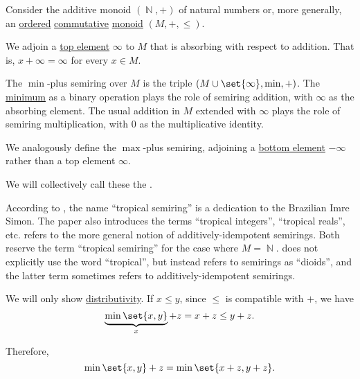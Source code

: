 \begin{definition}\label{def:tropical_semiring}
  Consider the additive monoid \( (\BbbN, +) \) of natural numbers or, more generally, an \hyperref[def:ordered_semigroup]{ordered} \hyperref[def:binary_operation/commutative]{commutative} \hyperref[def:monoid]{monoid} \( (M, +, \leq) \).

  We adjoin a \hyperref[def:extremal_points/top_and_bottom]{top element} \( \infty \) to \( M \) that is absorbing with respect to addition. That is, \( x + \infty = \infty \) for every \( x \in M \).

  The \( \min \)-plus semiring over \( M \) is the triple \( (M \cup \set{ \infty }, \min, +) \). The \hyperref[def:extremal_points/maximum_and_minimum]{minimum} as a binary operation plays the role of semiring addition, with \( \infty \) as the absorbing element. The usual addition in \( M \) extended with \( \infty \) plays the role of semiring multiplication, with \( 0 \) as the multiplicative identity.

  We analogously define the \( \max \)-plus semiring, adjoining a \hyperref[def:extremal_points/top_and_bottom]{bottom element} \( -\infty \) rather than a top element \( \infty \).

  We will collectively call these the .
\end{definition}
\begin{comments}
  \item According to , the name \enquote{tropical semiring} is a dedication to the Brazilian Imre Simon. The paper also introduces the terms \enquote{tropical integers}, \enquote{tropical reals}, etc.  refers to the more general notion of additively-idempotent semirings. Both reserve the term \enquote{tropical semiring} for the case where \( M = \BbbN \).  does not explicitly use the word \enquote{tropical}, but instead refers to semirings as \enquote{dioids}, and the latter term sometimes refers to additively-idempotent semirings.
\end{comments}
\begin{defproof}
  We will only show \hyperref[def:semiring/left_distributivity]{distributivity}. If \( x \leq y \), since \( \leq \) is compatible with \( + \), we have
  \begin{equation*}
    \underbrace{\min\set{ x, y }}_{x} + z = x + z \leq y + z.
  \end{equation*}

  Therefore,
  \begin{equation*}
    \min\set{ x, y } + z = \min\set{ x + z , y + z }.
  \end{equation*}
\end{defproof}

